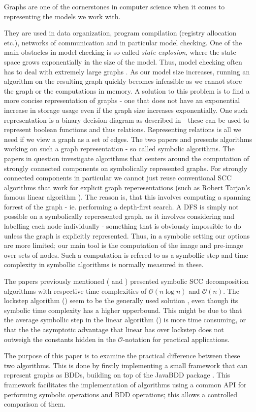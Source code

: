 \documentclass[../master/master.tex]{subfiles}
\begin{document}
Graphs are one of the cornerstones in computer science when it comes to representing the models we work with. 

They are used in data organization,  program compilation (registry allocation etc.), networks of communication and in particular model checking. One of the main obstacles in model checking is so called \textit{state explosion}, where the state space grows exponentially in the size of the model. Thus, model checking often has to deal with extremely large graphs \cite{pelanek_2004}. As our model size increases, running an algorithm on the resulting graph quickly becomes infeasible as we cannot store the graph or the computations in memory. A solution to this problem is to find a more concise representation of graphs - one that does not have an exponential increase in storage usage even if the graph size increases exponentially. One such representation is a binary decision diagram as described in \cite{bryant_1992} - these can be used to represent boolean functions and thus relations. Representing relations is all we need if we view a graph as a set of edges. The two papers \cite{linear} and \cite{lockstep} presents algorithms working on such a graph representation - so called symbolic algorithms. The papers in question investigate algorithms that centers around the computation of strongly connected components on symbolically represented graphs. For strongly connected components in particular we cannot just reuse conventional SCC algorithms that work for explicit graph reperesentations (such as Robert Tarjan's famous linear algorithm \cite{tarjan_1971}). The reason is, that this involves computing a spanning forrest of the graph - ie. performing a depth-first search. A DFS is simply not possible on a symbolically reperesented graph, as it involves considering and labelling each node individually - something that is obviously impossible to do unless the graph is explicitly represented. Thus, in a symbolic setting our options are more limited; our main tool is the computation of the image and pre-image over sets of nodes. Such a computation is refered to as a symbollic step and time complexity in symbollic algorithms is normally measured in these.

The papers previously mentioned (\cite{linear} and \cite{lockstep}) presented symbolic SCC decomposition algorithms with respective time complexities of $\mathcal{O}(n \log n)$ and $\mathcal{O}(n)$. The lockstep algorithm (\cite{lockstep}) seem to be the generally used solution , even though its symbolic time complexity has a higher upperbound. This might be due to that the average symbollic step in the linear algorithm (\cite{linear}) is more time consuming, or that the the asymptotic advantage that linear has over lockstep does not outweigh the constants hidden in the $\mathcal{O} $-notation for practical applications.

The purpose of this paper is to examine the practical difference between these two algorithms. This is done by firstly implementing a small framework that can represent graphs as BDDs, building on top of the JavaBDD package \cite{whaley}. This framework facilitates the implementation of algorithms using a common API for performing symbolic operations and BDD operations; this allows a controlled comparison of them. 
\end{document}
